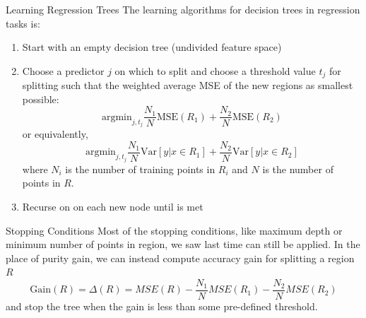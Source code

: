 \documentclass[12pt,t]{beamer}
\let\emph\relax %
\begin{document}
\begin{frame}{Learning Regression Trees} 
\vskip-0.4cm
\footnotesize
The learning algorithms for decision trees in regression tasks is:
\vskip0.2cm
\begin{enumerate}
\item Start with an empty decision tree (undivided feature space)
\item Choose a predictor $j$ on which to split and choose a threshold value $t_j$ for splitting such that the weighted average MSE of the new regions as smallest possible:
\[
\mathrm{argmin}_{j, t_j}  \frac{N_1}{N} \mathrm{MSE}(R_1) +  \frac{N_2}{N} \mathrm{MSE}(R_2) 
\]
or equivalently,
\[
\mathrm{argmin}_{j, t_j}  \frac{N_1}{N} \mathrm{Var}[y | x\in R_1] + \frac{N_2}{N} \mathrm{Var}[y |  x\in R_2]
\]
where $N_i$ is the number of training points in $R_i$ and $N$ is the number of points in $R$.
\item Recurse on on each new node until \emph{stopping condition} is met
\end{enumerate}
\end{frame}

\begin{frame}{Stopping Conditions} 
\vskip0.2cm
Most of the stopping conditions, like maximum depth or minimum number of points in region, we saw last time can still be applied. 
\vskip0.2cm
In the place of purity gain, we can instead compute accuracy gain for splitting a region $R$
\[
\text{Gain}(R) = \Delta(R) = MSE(R) - \frac{N_1}{N} MSE(R_1) -  \frac{N_2}{N} MSE(R_2)
\]
and stop the tree when the gain is less than some pre-defined threshold.
\end{frame}
\end{document}
